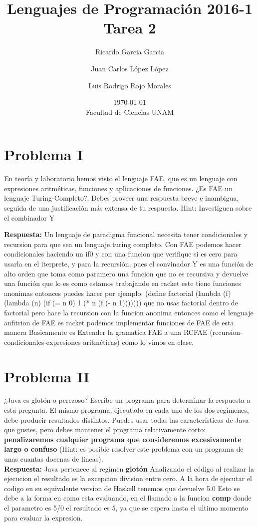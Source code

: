 \documentclass{article}
\title{Lenguajes de Programación 2016-1\\Tarea 2}
\author{Ricardo Garcia Garcia \and  Juan Carlos López López \and Luis Rodrigo Rojo Morales}
\date{\today\\ Facultad de Ciencias UNAM}
\begin{document}
\maketitle
\section*{Problema I}
En teoría y laboratorio hemos visto el lenguaje FAE, que es un lenguaje
con expresiones aritméticas, funciones y aplicaciones de funciones.
¿Es FAE un lenguaje Turing-Completo?. Debes proveer una respuesta breve e inambigua, seguida de una justificación más extensa de tu respuesta.
Hint: Investiguen sobre el combinador Y

\textbf{Respuesta: }
Un lenguaje de paradigma funcional necesita tener condicionales y recursion para que sea un lenguaje turing completo.
Con FAE podemos hacer condicionales haciendo un if0 y con una funcion que verifique si es cero para usarla en el iterprete,
y para la recursión, pues el convinador Y es una función de alto orden que toma como paramero una funcion que no es 
recursiva y devuelve una función que lo es como estamos trabajando en racket este tiene funciones anonimas entonces puedes hacer por ejemplo:
(define factorial
    (lambda (f)
      (lambda (n)
        (if (= n 0)
            1
            (* n (f (- n 1)))))))
que no usas factorial dentro de factorial pero hace la recursion con la funcion anonima entonces como el lenguaje anfitrion de FAE es racket podemos implementar funciones de FAE de esta manera
Basicamente es Extender la gramatica FAE a una RCFAE (recursion-condicionales-expresiones aritméticas) como lo vimos en clase.
\section*{Problema II}
¿Java es glotón o perezoso? Escribe un programa para determinar la respuesta a esta
pregunta. El mismo programa, ejecutado en cada uno de los dos regímenes, debe
producir resultados distintos. Puedes usar todas las características de Java
que gustes, pero debes mantener el programa relativamente corto:
\textbf{penalizaremos cualquier programa que consideremos excesivamente
  largo o confuso } (Hint: es posible resolver este problema con un programa
de unas cuantas docenas de lineas).
\\

\textbf{Respuesta: }
Java pertenece al regímen \textbf{glotón} Analizando el código al realizar la ejecucion el resultado es la excepcion division entre cero.
A la hora de ejecutar el codigo en su equivalente version de Haskell tenemos que devuelve 5.0
Esto se debe a la forma en como esta evaluando, en el llamado a la funcion \textbf{comp} donde el parametro es 5/0 el resultado es 5, ya que se espera hasta el ultimo momento
para evaluar la expresion.
\end{document}
